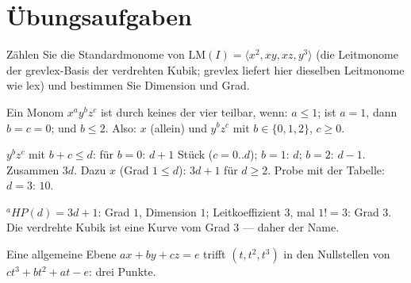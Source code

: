 \section{Übungsaufgaben}

\begin{aufgabe}
Zählen Sie die Standardmonome von $\mathrm{LM}(I) = \langle x^{2}, xy, xz, y^{3}\rangle$ (die Leitmonome der grevlex-Basis der verdrehten Kubik; grevlex liefert hier dieselben Leitmonome wie lex) und bestimmen Sie Dimension und Grad.

\loesung
{}
Ein Monom $x^{a}y^{b}z^{c}$ ist durch keines der vier teilbar, wenn: $a\le1$; ist $a = 1$, dann $b = c = 0$; und $b\le2$. Also: $x$ (allein) und $y^{b}z^{c}$ mit $b\in\{0, 1, 2\}$, $c\ge0$.

$y^{b}z^{c}$ mit $b + c\le d$: für $b = 0$: $d + 1$ Stück ($c = 0..d$); $b = 1$: $d$; $b = 2$: $d - 1$. Zusammen $3d$. Dazu $x$ (Grad $1\le d$): $3d + 1$ für $d\ge2$. Probe mit der Tabelle: $d = 3$: $10$. \checkmark

${}^{a}\!HP(d) = 3d + 1$: Grad $1$, Dimension $1$; Leitkoeffizient $3$, mal $1! = 3$: Grad $3$. Die verdrehte Kubik ist eine Kurve vom Grad $3$ --- daher der Name.

Eine allgemeine Ebene $ax + by + cz = e$ trifft $(t, t^{2}, t^{3})$ in den Nullstellen von $ct^{3} + bt^{2} + at - e$: drei Punkte. \checkmark

\begin{center}
\begin{minipage}{0.88\textwidth}
\end{minipage}
\end{center}
\end{aufgabe}

